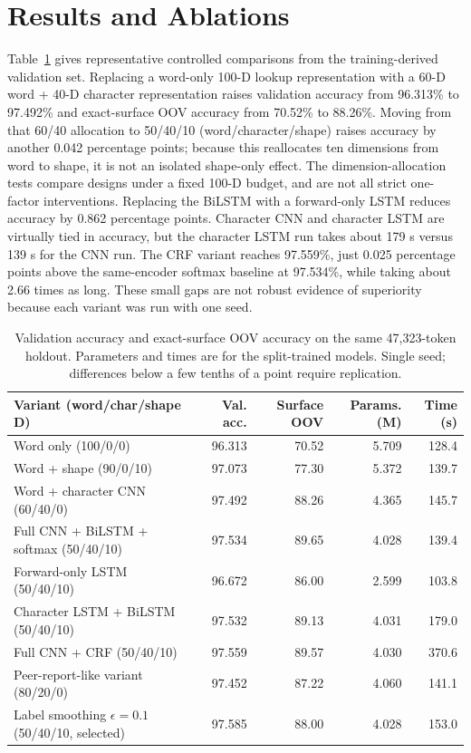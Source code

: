 \documentclass[11pt]{article}
\begin{document}
\section{Results and Ablations}
Table~\ref{tab:ablations} gives representative controlled comparisons from the training-derived validation set. Replacing a word-only 100-D lookup representation with a 60-D word + 40-D character representation raises validation accuracy from 96.313\% to 97.492\% and exact-surface OOV accuracy from 70.52\% to 88.26\%. Moving from that 60/40 allocation to 50/40/10 (word/character/shape) raises accuracy by another 0.042 percentage points; because this reallocates ten dimensions from word to shape, it is not an isolated shape-only effect. The dimension-allocation tests compare designs under a fixed 100-D budget, and are not all strict one-factor interventions. Replacing the BiLSTM with a forward-only LSTM reduces accuracy by 0.862 percentage points. Character CNN and character LSTM are virtually tied in accuracy, but the character LSTM run takes about 179 s versus 139 s for the CNN run. The CRF variant reaches 97.559\%, just 0.025 percentage points above the same-encoder softmax baseline at 97.534\%, while taking about 2.66 times as long. These small gaps are not robust evidence of superiority because each variant was run with one seed.

\begin{table}[t]
\centering
\small
\setlength{\tabcolsep}{5pt}
\begin{tabular}{p{5.1cm}rrrr}
\toprule
Variant (word/char/shape D) & Val. acc. & Surface OOV & Params. (M) & Time (s)\\
\midrule
Word only (100/0/0) & 96.313 & 70.52 & 5.709 & 128.4\\
Word + shape (90/0/10) & 97.073 & 77.30 & 5.372 & 139.7\\
Word + character CNN (60/40/0) & 97.492 & 88.26 & 4.365 & 145.7\\
Full CNN + BiLSTM + softmax (50/40/10) & 97.534 & 89.65 & 4.028 & 139.4\\
Forward-only LSTM (50/40/10) & 96.672 & 86.00 & 2.599 & 103.8\\
Character LSTM + BiLSTM (50/40/10) & 97.532 & 89.13 & 4.031 & 179.0\\
Full CNN + CRF (50/40/10) & 97.559 & 89.57 & 4.030 & 370.6\\
Peer-report-like variant (80/20/0) & 97.452 & 87.22 & 4.060 & 141.1\\
Label smoothing $\epsilon=0.1$ (50/40/10, selected) & 97.585 & 88.00 & 4.028 & 153.0\\
\bottomrule
\end{tabular}
\caption{Validation accuracy and exact-surface OOV accuracy on the same 47,323-token holdout. Parameters and times are for the split-trained models. Single seed; differences below a few tenths of a point require replication.}
\label{tab:ablations}
\end{table}
\end{document}
